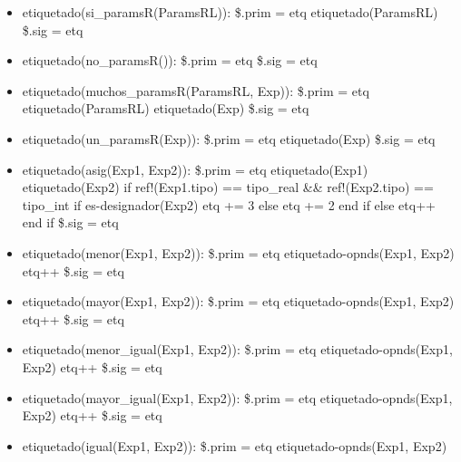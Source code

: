 \documentclass[11pt]{article}
\begin{document}
\begin{itemize}
        \item etiquetado(si\_paramsR(ParamsRL)): 
            \subitem \$.prim = etq
            \subitem etiquetado(ParamsRL)
            \subitem \$.sig = etq
        \item etiquetado(no\_paramsR()): 
            \subitem \$.prim = etq
            \subitem \$.sig = etq
        \item etiquetado(muchos\_paramsR(ParamsRL, Exp)): 
            \subitem \$.prim = etq
            \subitem etiquetado(ParamsRL)
            \subitem etiquetado(Exp)
            \subitem \$.sig = etq
        \item etiquetado(un\_paramsR(Exp)): 
            \subitem \$.prim = etq
            \subitem etiquetado(Exp)
            \subitem \$.sig = etq
        \item etiquetado(asig(Exp1, Exp2)): 
            \subitem \$.prim = etq
            \subitem etiquetado(Exp1)
            \subitem etiquetado(Exp2)
            \subitem if ref!(Exp1.tipo) == tipo\_real \&\& ref!(Exp2.tipo) == tipo\_int
                \subsubitem if es-designador(Exp2)
                    \subsubitem \hspace{2em} etq += 3
                \subsubitem else
                    \subsubitem \hspace{2em} etq += 2
                \subsubitem end if
            \subitem else
                \subsubitem etq++
            \subitem end if
            \subitem \$.sig = etq
        \item etiquetado(menor(Exp1, Exp2)): 
            \subitem \$.prim = etq
            \subitem etiquetado-opnds(Exp1, Exp2)
            \subitem etq++
            \subitem \$.sig = etq
        \item etiquetado(mayor(Exp1, Exp2)): 
            \subitem \$.prim = etq
            \subitem etiquetado-opnds(Exp1, Exp2)
            \subitem etq++
            \subitem \$.sig = etq
        \item etiquetado(menor\_igual(Exp1, Exp2)): 
            \subitem \$.prim = etq
            \subitem etiquetado-opnds(Exp1, Exp2)
            \subitem etq++
            \subitem \$.sig = etq
        \item etiquetado(mayor\_igual(Exp1, Exp2)): 
            \subitem \$.prim = etq
            \subitem etiquetado-opnds(Exp1, Exp2)
            \subitem etq++
            \subitem \$.sig = etq
        \item etiquetado(igual(Exp1, Exp2)): 
            \subitem \$.prim = etq
            \subitem etiquetado-opnds(Exp1, Exp2)

\end{itemize}
\end{document}

